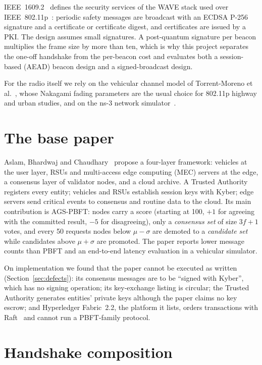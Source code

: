 IEEE~1609.2~\cite{ieee16092} defines the security services of the WAVE stack
used over IEEE~802.11p~\cite{ieee80211p}: periodic safety messages are
broadcast with an ECDSA P-256 signature and a certificate or certificate
digest, and certificates are issued by a PKI. The design assumes small
signatures. A post-quantum signature per beacon multiplies the frame size by
more than ten, which is why this project separates the one-off handshake
from the per-beacon cost and evaluates both a session-based (AEAD) beacon
design and a signed-broadcast design.

For the radio itself we rely on the vehicular channel model of
Torrent-Moreno et al.~\cite{torrent}, whose Nakagami fading parameters are
the usual choice for 802.11p highway and urban studies, and on the ns-3
network simulator~\cite{ns3}.

\section{The base paper}

Aslam, Bhardwaj and Chaudhary~\cite{base} propose a four-layer framework:
vehicles at the user layer, RSUs and multi-access edge computing (MEC) servers
at the edge, a consensus layer of validator nodes, and a cloud archive. A
Trusted Authority registers every entity; vehicles and RSUs establish session
keys with Kyber; edge servers send critical events to consensus and routine
data to the cloud. Its main contribution is AGS-PBFT: nodes carry a score
(starting at 100, $+1$ for agreeing with the committed result, $-5$ for
disagreeing), only a \emph{consensus set} of size $3f+1$ votes, and every 50
requests nodes below $\mu - \sigma$ are demoted to a \emph{candidate set}
while candidates above $\mu + \sigma$ are promoted. The paper reports lower
message counts than PBFT and an end-to-end latency evaluation in a vehicular
simulator.

On implementation we found that the paper cannot be executed as written
(Section~\ref{sec:defects}): its consensus messages are to be ``signed with
Kyber'', which has no signing operation; its key-exchange listing is circular;
the Trusted Authority generates entities' private keys although the paper
claims no key escrow; and Hyperledger Fabric~2.2, the platform it lists,
orders transactions with Raft~\cite{fabric} and cannot run a PBFT-family
protocol.

\section{Handshake composition}


